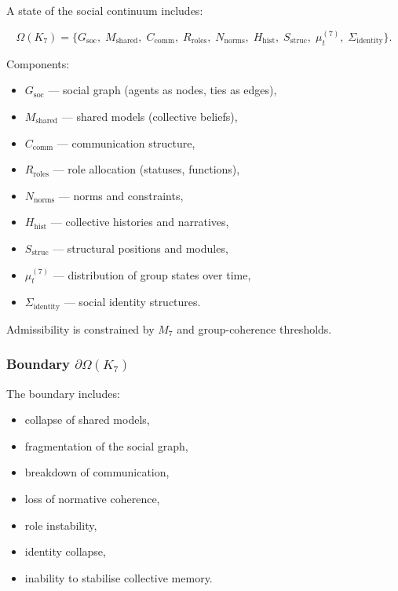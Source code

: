 A state of the social continuum includes:

\[
\Omega(K_7)=
\{
G_{\mathrm{soc}},\;
M_{\mathrm{shared}},\;
C_{\mathrm{comm}},\;
R_{\mathrm{roles}},\;
N_{\mathrm{norms}},\;
H_{\mathrm{hist}},\;
S_{\mathrm{struc}},\;
\mu^{(7)}_t,\;
\Sigma_{\mathrm{identity}}
\}.
\]

Components:
\begin{itemize}
    \item $G_{\mathrm{soc}}$ — social graph (agents as nodes, ties as edges),
    \item $M_{\mathrm{shared}}$ — shared models (collective beliefs),
    \item $C_{\mathrm{comm}}$ — communication structure,
    \item $R_{\mathrm{roles}}$ — role allocation (statuses, functions),
    \item $N_{\mathrm{norms}}$ — norms and constraints,
    \item $H_{\mathrm{hist}}$ — collective histories and narratives,
    \item $S_{\mathrm{struc}}$ — structural positions and modules,
    \item $\mu^{(7)}_t$ — distribution of group states over time,
    \item $\Sigma_{\mathrm{identity}}$ — social identity structures.
\end{itemize}

Admissibility is constrained by $M_7$ and group-coherence thresholds.

\subsubsection{Boundary \texorpdfstring{$\partial\Omega(K_7)$}{\partial\Omega(K_7)}}

The boundary includes:
\begin{itemize}
    \item collapse of shared models,
    \item fragmentation of the social graph,
    \item breakdown of communication,
    \item loss of normative coherence,
    \item role instability,
    \item identity collapse,
    \item inability to stabilise collective memory.
\end{itemize}

